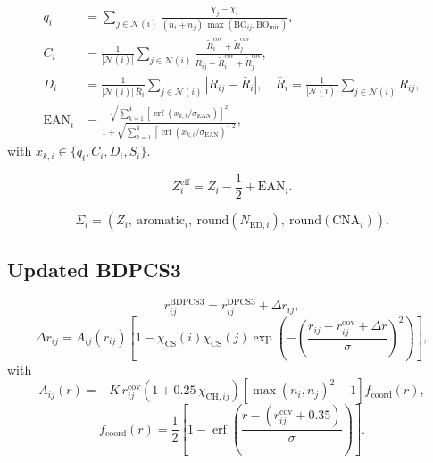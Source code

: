 \documentclass[a4paper,11pt]{article}
\begin{document}
\begin{align}
q_i &= \sum_{j\in\mathcal{N}(i)}
\frac{\chi_j-\chi_i}{(n_i+n_j)\,\max(\mathrm{BO}_{ij},\mathrm{BO}_{\min})},\\
C_i &= \frac{1}{|\mathcal{N}(i)|}\sum_{j\in\mathcal{N}(i)}
\frac{\tilde R^{\mathrm{cov}}_i+\tilde R^{\mathrm{cov}}_j}
{R_{ij}+\tilde R^{\mathrm{cov}}_i+\tilde R^{\mathrm{cov}}_j},\\
D_i &= \frac{1}{|\mathcal{N}(i)|\,\bar R_i}\sum_{j\in\mathcal{N}(i)}\left|R_{ij}-\bar R_i\right|,
\quad
\bar R_i=\frac{1}{|\mathcal{N}(i)|}\sum_{j\in\mathcal{N}(i)}R_{ij},\\
\mathrm{EAN}_i &= \frac{\sqrt{\sum_{k=1}^{4}\left[\operatorname{erf}(x_{k,i}/\sigma_{\mathrm{EAN}})\right]^2}}
{1+\sqrt{\sum_{k=1}^{4}\left[\operatorname{erf}(x_{k,i}/\sigma_{\mathrm{EAN}})\right]^2}},
\end{align}
with $x_{k,i}\in\{q_i,C_i,D_i,S_i\}$.

\begin{equation}
Z^{\mathrm{eff}}_i = Z_i-\frac{1}{2}+\mathrm{EAN}_i.
\end{equation}

\begin{equation}
\Sigma_i=\left(Z_i,\ \mathrm{aromatic}_i,\ \mathrm{round}(N_{\mathrm{ED},i}),\ \mathrm{round}(\mathrm{CNA}_i)\right).
\end{equation}

\subsection{Updated BDPCS3}
\begin{equation}
r_{ij}^{\mathrm{BDPCS3}} = r_{ij}^{\mathrm{DPCS3}}+\Delta r_{ij},
\end{equation}
\begin{equation}
\Delta r_{ij}
=A_{ij}(r_{ij})
\left[1-\chi_{\mathrm{CS}}(i)\chi_{\mathrm{CS}}(j)
\exp\!\left(-\left(\frac{r_{ij}-r^{\mathrm{cov}}_{ij}+\Delta r}{\sigma}\right)^2\right)\right],
\end{equation}
with
\begin{equation}
A_{ij}(r)
=-K\,r^{\mathrm{cov}}_{ij}
\left(1+0.25\,\chi_{\mathrm{CH},ij}\right)
\left[\max(n_i,n_j)^2-1\right]
f_{\mathrm{coord}}(r),
\end{equation}
\begin{equation}
f_{\mathrm{coord}}(r)=\frac{1}{2}\left[1-\operatorname{erf}\!\left(\frac{r-(r^{\mathrm{cov}}_{ij}+0.35)}{\sigma}\right)\right].
\end{equation}
\end{document}
